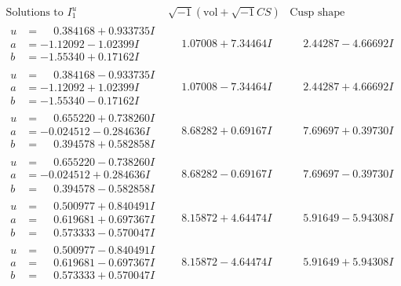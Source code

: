 \documentclass[1p]{elsarticle_modified}
\theoremstyle{definition}
\newcommand{\I}{\sqrt{-1}}
\begin{document}
$$\begin{array}{c|c|c}  
\text{Solutions to }I^u_{1}& \I (\text{vol} + \sqrt{-1}CS) & \text{Cusp shape}\\
 \hline 
\begin{aligned}
u &= \phantom{-}0.384168 + 0.933735 I \\
a &= -1.12092 - 1.02399 I \\
b &= -1.55340 + 0.17162 I\end{aligned}
 & \phantom{-}1.07008 + 7.34464 I & \phantom{-}2.44287 - 4.66692 I \\ \hline\begin{aligned}
u &= \phantom{-}0.384168 - 0.933735 I \\
a &= -1.12092 + 1.02399 I \\
b &= -1.55340 - 0.17162 I\end{aligned}
 & \phantom{-}1.07008 - 7.34464 I & \phantom{-}2.44287 + 4.66692 I \\ \hline\begin{aligned}
u &= \phantom{-}0.655220 + 0.738260 I \\
a &= -0.024512 - 0.284636 I \\
b &= \phantom{-}0.394578 + 0.582858 I\end{aligned}
 & \phantom{-}8.68282 + 0.69167 I & \phantom{-}7.69697 + 0.39730 I \\ \hline\begin{aligned}
u &= \phantom{-}0.655220 - 0.738260 I \\
a &= -0.024512 + 0.284636 I \\
b &= \phantom{-}0.394578 - 0.582858 I\end{aligned}
 & \phantom{-}8.68282 - 0.69167 I & \phantom{-}7.69697 - 0.39730 I \\ \hline\begin{aligned}
u &= \phantom{-}0.500977 + 0.840491 I \\
a &= \phantom{-}0.619681 + 0.697367 I \\
b &= \phantom{-}0.573333 - 0.570047 I\end{aligned}
 & \phantom{-}8.15872 + 4.64474 I & \phantom{-}5.91649 - 5.94308 I \\ \hline\begin{aligned}
u &= \phantom{-}0.500977 - 0.840491 I \\
a &= \phantom{-}0.619681 - 0.697367 I \\
b &= \phantom{-}0.573333 + 0.570047 I\end{aligned}
 & \phantom{-}8.15872 - 4.64474 I & \phantom{-}5.91649 + 5.94308 I \\ \hline\begin{aligned}

\end{aligned}
\end{array}$$
\end{document}
